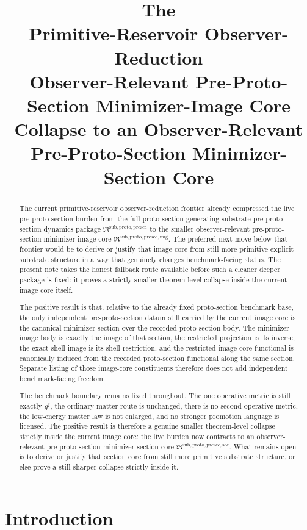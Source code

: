\documentclass[11pt]{article}
\title{\textbf{The \TheoryName{}}\\[0.4em]
\large Primitive-Reservoir Observer-Reduction\\
\large Observer-Relevant Pre-Proto-Section Minimizer-Image Core\\
\large Collapse to an Observer-Relevant Pre-Proto-Section Minimizer-Section Core}
\author{}
\date{}
\newcommand{\CompletedMetric}{g^{\sharp}}
\newcommand{\PreProtoSectionPackage}{\mathfrak R^{\mathrm{sub,proto,presec}}}
\newcommand{\PreProtoSectionImageCore}{\mathfrak R^{\mathrm{sub,proto,presec,img}}}
\newcommand{\PreProtoSectionMinSectionCore}{\mathfrak R^{\mathrm{sub,proto,presec,sec}}}
\begin{document}
\maketitle

\begin{abstract}
The current primitive-reservoir observer-reduction frontier already compressed the live pre-proto-section burden from the full proto-section-generating substrate pre-proto-section dynamics package \(\PreProtoSectionPackage\) to the smaller observer-relevant pre-proto-section minimizer-image core \(\PreProtoSectionImageCore\). The preferred next move below that frontier would be to derive or justify that image core from still more primitive explicit substrate structure in a way that genuinely changes benchmark-facing status. The present note takes the honest fallback route available before such a cleaner deeper package is fixed: it proves a strictly smaller theorem-level collapse inside the current image core itself.

The positive result is that, relative to the already fixed proto-section benchmark base, the only independent pre-proto-section datum still carried by the current image core is the canonical minimizer section over the recorded proto-section body. The minimizer-image body is exactly the image of that section, the restricted projection is its inverse, the exact-shell image is its shell restriction, and the restricted image-core functional is canonically induced from the recorded proto-section functional along the same section. Separate listing of those image-core constituents therefore does not add independent benchmark-facing freedom.

The benchmark boundary remains fixed throughout. The one operative metric is still exactly \(\CompletedMetric\), the ordinary matter route is unchanged, there is no second operative metric, the low-energy matter law is not enlarged, and no stronger promotion language is licensed. The positive result is therefore a genuine smaller theorem-level collapse strictly inside the current image core: the live burden now contracts to an observer-relevant pre-proto-section minimizer-section core \(\PreProtoSectionMinSectionCore\). What remains open is to derive or justify that section core from still more primitive substrate structure, or else prove a still sharper collapse strictly inside it.
\end{abstract}

\section{Introduction}
\end{document}
